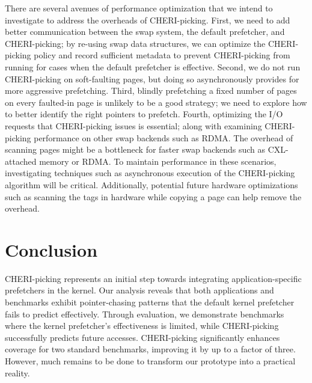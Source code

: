 There are several avenues of performance optimization that we intend to investigate to address the overheads of CHERI-picking. First, we need to add better communication between the swap system, the default prefetcher, and CHERI-picking; by re-using swap data structures, we can optimize the CHERI-picking policy and record sufficient metadata to prevent CHERI-picking from running for cases when the default prefetcher is effective.
Second, we do not run CHERI-picking on soft-faulting pages, but doing so asynchronously provides for more aggressive prefetching.
Third, blindly prefetching a fixed number of pages on every faulted-in page is unlikely to be a good strategy; we need to explore how to better identify the right pointers to prefetch. Fourth, optimizing the I/O requests that CHERI-picking issues is essential; along with examining CHERI-picking performance on other swap backends such as RDMA. The overhead of scanning pages might be a bottleneck for faster swap backends such as CXL-attached memory or RDMA. To maintain performance in these scenarios, investigating techniques such as asynchronous execution of the CHERI-picking algorithm will be critical.  Additionally, potential future hardware optimizations such as scanning the tags in hardware while copying a page can help remove the overhead.



\section{Conclusion} 

CHERI-picking represents an initial step towards integrating application-specific prefetchers in the kernel.
Our analysis reveals that both applications and benchmarks exhibit pointer-chasing patterns that the default kernel prefetcher fails to predict effectively. 
Through evaluation, we demonstrate benchmarks where the kernel prefetcher's effectiveness is limited, while CHERI-picking successfully predicts future accesses. 
CHERI-picking significantly enhances coverage for two standard benchmarks, improving it by up to a factor of three. 
However, much remains to be done to transform our prototype into a practical reality.

